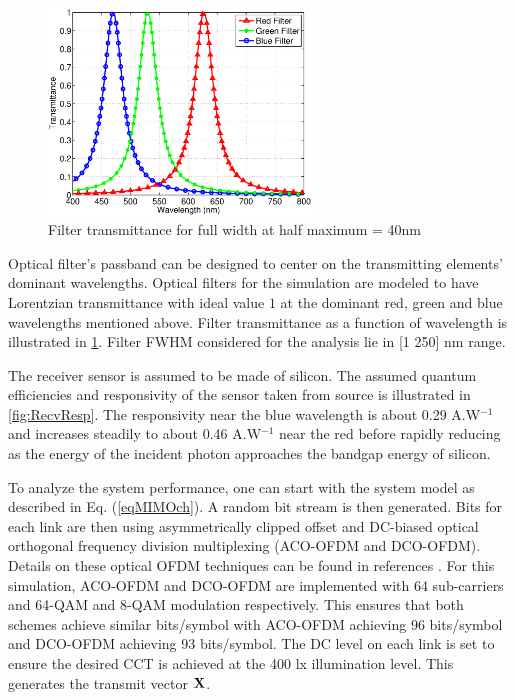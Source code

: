 \begin{figure}[!t]
	\centering
		\includegraphics[trim={0.15in 0.05in 0.05in 0.35in}, clip=true, width=2.75in]{img/FiltTr.eps}
	\caption{Filter transmittance for full width at half maximum = 40nm}
	\label{fig:FiltTr}
\end{figure}

Optical filter's passband can be designed to center on the transmitting elements' dominant wavelengths. Optical filters for the simulation are modeled to have Lorentzian transmittance with ideal value $1$ at the dominant red, green and blue wavelengths mentioned above. Filter transmittance as a function of wavelength is illustrated in \figurename{\ref{fig:FiltTr}}. Filter FWHM considered for the analysis lie in [1 250] nm range.

The receiver sensor is assumed to be made of silicon. The assumed quantum efficiencies and responsivity of the sensor taken from source \cite{qeff} is illustrated in \figurename{\ref{fig:RecvResp}}. The responsivity near the blue wavelength is about 0.29 A.W$^{-1}$ and increases steadily to about 0.46 A.W$^{-1}$ near the red before rapidly reducing as the energy of the incident photon approaches the bandgap energy of silicon.

To analyze the system performance, one can start with the system model as described in Eq. (\ref{eqMIMOch}). A random bit stream is then generated. Bits for each link are then using asymmetrically clipped offset and DC-biased optical orthogonal frequency division multiplexing (ACO-OFDM and DCO-OFDM). Details on these optical OFDM techniques can be found in references \cite{car96a,arm06a}. For this simulation, ACO-OFDM and DCO-OFDM are implemented with 64 sub-carriers and 64-QAM and 8-QAM modulation respectively. This ensures that both schemes achieve similar bits/symbol with ACO-OFDM achieving 96 bits/symbol and DCO-OFDM achieving 93 bits/symbol. The DC level on each link is set to ensure the desired CCT is achieved at the 400 lx illumination level. This generates the transmit vector ${\bf{X}}$. 

